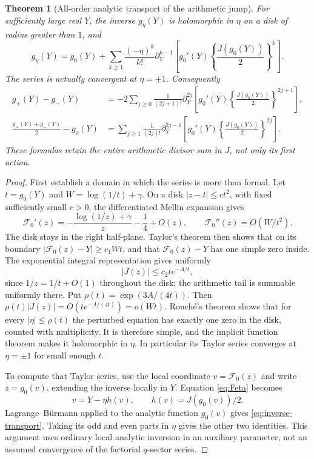 \documentclass[11pt,a4paper]{article}
\numberwithin{equation}{section}
\newtheorem{theorem}{Theorem}[section]
\theoremstyle{definition}\newtheorem{definition}[theorem]{Definition}
\theoremstyle{remark}\newtheorem{remark}[theorem]{Remark}
\newcommand{\F}{\mathcal F}\newcommand{\CC}{\mathcal C}
\begin{document}
\begin{theorem}[All-order analytic transport of the arithmetic jump]
\label{thm:inverse-transport}
For sufficiently large real $Y$, the inverse $g_\eta(Y)$ is holomorphic
in $\eta$ on a disk of radius greater than $1$, and
\begin{equation}\label{eq:inverse-transport}
 g_\eta(Y)=g_0(Y)+\sum_{k\ge1}\frac{(-\eta)^k}{k!}
 \partial_Y^{k-1}\left[
 g_0'(Y)\left\{\frac{J(g_0(Y))}{2}\right\}^{k}\right].
\end{equation}
The series is actually convergent at $\eta=\pm1$. Consequently
\begin{align}
 g_+(Y)-g_-(Y)
 &=-2\sum_{j\ge0}\frac1{(2j+1)!}
 \partial_Y^{2j}\left[
 g_0'(Y)\left\{\frac{J(g_0(Y))}{2}\right\}^{2j+1}\right],
 \label{eq:inverse-jump-all}\\
 \frac{g_+(Y)+g_-(Y)}2-g_0(Y)
 &=\sum_{j\ge1}\frac1{(2j)!}
 \partial_Y^{2j-1}\left[
 g_0'(Y)\left\{\frac{J(g_0(Y))}{2}\right\}^{2j}\right].
 \label{eq:inverse-average-all}
\end{align}
These formulas retain the entire arithmetic divisor sum in $J$, not
only its first action.
\end{theorem}
\begin{proof}
First establish a domain in which the series is more than formal.
Let $t=g_0(Y)$ and $W=\log(1/t)+\gamma$. On a disk
$|z-t|\le c t^2$, with fixed sufficiently small $c>0$, the differentiated
Mellin expansion gives
\[
 \F_0'(z)=-\frac{\log(1/z)+\gamma}{z}-\frac14+O(z),
 \qquad \F_0''(z)=O(W/t^2).
\]
The disk stays in the right half-plane. Taylor's theorem then shows
that on its boundary
$|\F_0(z)-Y|\ge c_1 Wt$, and that $\F_0(z)-Y$ has one simple
zero inside. The exponential integral representation gives uniformly
\[
 |J(z)|\le c_2 t e^{-A/t},
\]
since $1/z=1/t+O(1)$ throughout the disk; the arithmetic tail is
summable uniformly there.
Put $\rho(t)=\exp(3A/(4t))$. Then
$\rho(t)|J(z)|=O(t e^{-A/(4t)})=o(Wt)$.
Rouch\'e's theorem shows that for every $|\eta|\le\rho(t)$ the
perturbed equation has exactly one zero in the disk, counted with
multiplicity. It is therefore simple, and the implicit function theorem
makes it holomorphic in $\eta$. In particular its Taylor series
converges at $\eta=\pm1$ for small enough $t$.

To compute that Taylor series, use the local coordinate
$v=\F_0(z)$ and write $z=g_0(v)$, extending the inverse locally in
$Y$. Equation \eqref{eq:Feta} becomes
\[
 v=Y-\eta h(v),\qquad h(v)=J(g_0(v))/2.
\]
Lagrange--B\"urmann applied to the analytic function $g_0(v)$ gives
\eqref{eq:inverse-transport}. Taking its odd and even parts in
$\eta$ gives the other two identities. This argument uses ordinary
local analytic inversion in an auxiliary parameter, not an assumed
convergence of the factorial $q$-sector series.
\end{proof}
\end{document}
